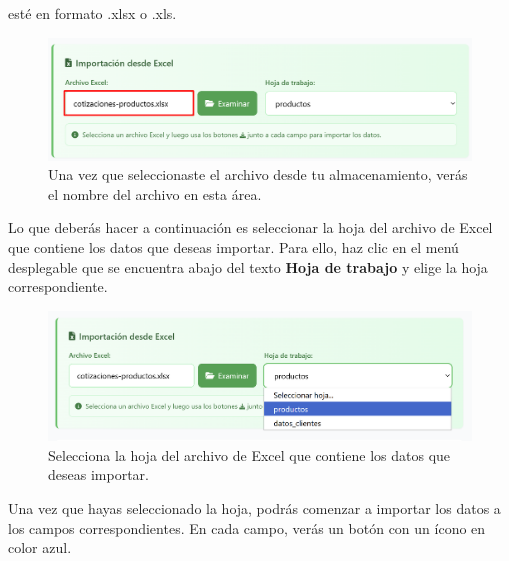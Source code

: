 \documentclass{Pretexto/bluereport}
\begin{document}
esté en formato .xlsx o .xls.
\begin{figure}[H] 
    \centering
        \includegraphics[width=0.85\linewidth]{img/archivos_cargados.png}
    \caption{Una vez que seleccionaste el archivo desde tu almacenamiento, verás el nombre del archivo en esta área.}
    \label{fig:llenado_manual}
\end{figure}
Lo que deberás hacer a continuación es seleccionar la hoja del archivo de Excel que contiene los datos que deseas importar. 
Para ello, haz clic en el menú desplegable que se encuentra abajo del texto  \textbf{Hoja de trabajo} y elige la hoja correspondiente.
\begin{figure}[H] 
    \centering
        \includegraphics[width=0.85\linewidth]{img/seleccionar_hoja.png}
    \caption{Selecciona la hoja del archivo de Excel que contiene los datos que deseas importar.}
    \label{fig:seleccionar_hoja}
\end{figure}

Una vez que hayas seleccionado la hoja, podrás comenzar a importar los datos a los campos correspondientes.
En cada campo, verás un botón con un ícono en color azul.
\end{document}
